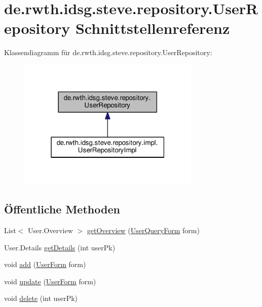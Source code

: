 \hypertarget{interfacede_1_1rwth_1_1idsg_1_1steve_1_1repository_1_1_user_repository}{\section{de.\+rwth.\+idsg.\+steve.\+repository.\+User\+Repository Schnittstellenreferenz}
\label{interfacede_1_1rwth_1_1idsg_1_1steve_1_1repository_1_1_user_repository}
}


Klassendiagramm für de.\+rwth.\+idsg.\+steve.\+repository.\+User\+Repository\+:\nopagebreak
\begin{figure}[H]
\begin{center}
\leavevmode
\includegraphics[width=247pt]{interfacede_1_1rwth_1_1idsg_1_1steve_1_1repository_1_1_user_repository__inherit__graph}
\end{center}
\end{figure}
\subsection*{Öffentliche Methoden}
\begin{DoxyCompactItemize}
\item 
List$<$ User.\+Overview $>$ \hyperlink{interfacede_1_1rwth_1_1idsg_1_1steve_1_1repository_1_1_user_repository_a5bd6560cf3b2e0c55e7cd21e5e48c7ee}{get\+Overview} (\hyperlink{classde_1_1rwth_1_1idsg_1_1steve_1_1web_1_1dto_1_1_user_query_form}{User\+Query\+Form} form)
\item 
User.\+Details \hyperlink{interfacede_1_1rwth_1_1idsg_1_1steve_1_1repository_1_1_user_repository_a60f2322c3b19fa2db03026a89a11ba4e}{get\+Details} (int user\+Pk)
\item 
void \hyperlink{interfacede_1_1rwth_1_1idsg_1_1steve_1_1repository_1_1_user_repository_abb61898f9441b72f02c8739b3f7702a2}{add} (\hyperlink{classde_1_1rwth_1_1idsg_1_1steve_1_1web_1_1dto_1_1_user_form}{User\+Form} form)
\item 
void \hyperlink{interfacede_1_1rwth_1_1idsg_1_1steve_1_1repository_1_1_user_repository_a4620073de7287f73d573d947f1c6dc21}{update} (\hyperlink{classde_1_1rwth_1_1idsg_1_1steve_1_1web_1_1dto_1_1_user_form}{User\+Form} form)
\item 
void \hyperlink{interfacede_1_1rwth_1_1idsg_1_1steve_1_1repository_1_1_user_repository_a5cd54ce3b5607bd049ccfede5fc8ef07}{delete} (int user\+Pk)
\end{DoxyCompactItemize}


